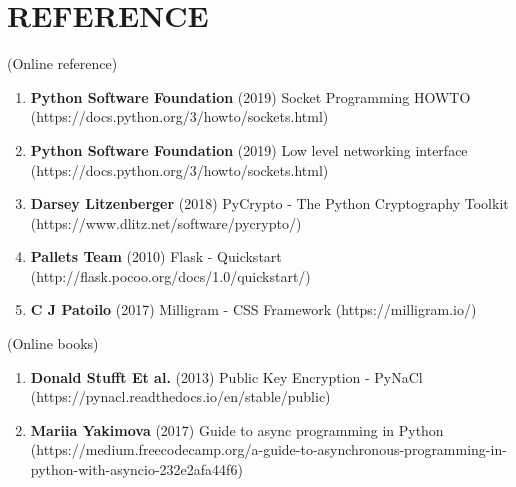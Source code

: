 \chapter*{\rm \large \bf REFERENCE}
\vspace{4.0mm}
\setlength{\parindent}{1cm} 

\scriptsize{(Online reference)}
\begin{enumerate}
    \item \textbf{Python Software Foundation} (2019) Socket Programming HOWTO
        (https://docs.python.org/3/howto/sockets.html)

    \item \textbf{Python Software Foundation} (2019) Low level networking
        interface (https://docs.python.org/3/howto/sockets.html)

    \item \textbf{Darsey Litzenberger} (2018) PyCrypto - The Python Cryptography
        Toolkit (https://www.dlitz.net/software/pycrypto/)

    \item \textbf{Pallets Team} (2010) Flask - Quickstart
        (http://flask.pocoo.org/docs/1.0/quickstart/)

    \item \textbf{C J Patoilo} (2017) Milligram - CSS Framework
        (https://milligram.io/)
\end{enumerate}

\scriptsize{(Online books)}
\begin{enumerate}
    \item \textbf{Donald Stufft Et al.} (2013) Public Key Encryption - PyNaCl
        (https://pynacl.readthedocs.io/en/stable/public)

    \item \textbf{Mariia Yakimova} (2017) Guide to async programming in Python
        (https://medium.freecodecamp.org/a-guide-to-asynchronous-programming-in-python-with-asyncio-232e2afa44f6)
\end{enumerate}

\newpage
